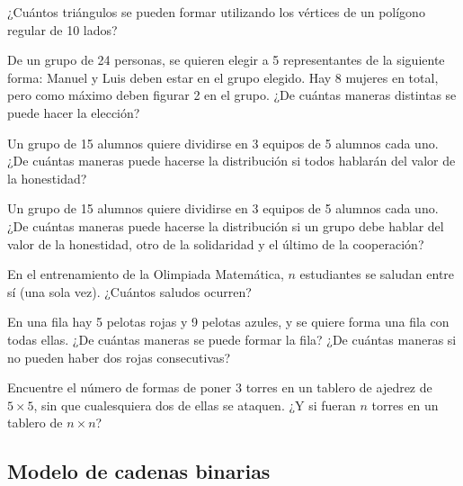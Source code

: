 \documentclass[12pt]{article}
\begin{document}
\begin{problema}
    ¿Cuántos triángulos se pueden formar utilizando los vértices de un polígono regular de 10 lados?
\end{problema}

\begin{problema}
    De un grupo de 24 personas, se quieren elegir a 5 representantes de la siguiente forma: Manuel y Luis deben estar en el grupo elegido. Hay 8 mujeres en total, pero como máximo deben figurar 2 en el grupo. ¿De cuántas maneras distintas se puede hacer la elección?
\end{problema}

\begin{problema}
    Un grupo de 15 alumnos quiere dividirse en 3 equipos de 5 alumnos cada uno. ¿De cuántas maneras puede hacerse la distribución si todos hablarán del valor de la honestidad?
\end{problema}

\begin{problema}
    Un grupo de 15 alumnos quiere dividirse en 3 equipos de 5 alumnos cada uno. ¿De cuántas maneras puede hacerse la distribución si un grupo debe hablar del valor de la honestidad, otro de la solidaridad y el último de la cooperación?
\end{problema}

\begin{problema}
    En el entrenamiento de la Olimpiada Matemática, $n$ estudiantes se saludan entre sí (una sola vez). ¿Cuántos saludos ocurren? 
\end{problema}

\begin{problema}
    En una fila hay 5 pelotas rojas y 9 pelotas azules, y se quiere forma una fila con todas ellas. ¿De cuántas maneras se puede formar la fila? ¿De cuántas maneras si no pueden haber dos rojas consecutivas?
\end{problema}

\begin{problema}
    Encuentre el número de formas de poner 3 torres en un tablero de ajedrez de $5 \times 5$, sin que cualesquiera dos de ellas se ataquen. ¿Y si fueran $n$ torres en un tablero de $n \times n$?
\end{problema}

\newpage

\subsection{Modelo de cadenas binarias}
\end{document}
